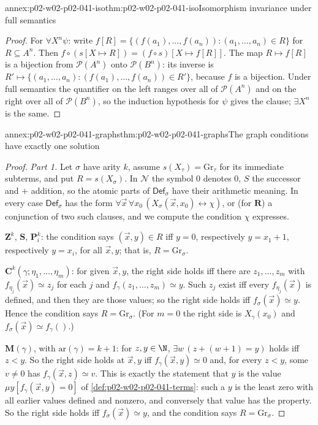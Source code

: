 \begin{annexitem}{annex:p02-w02-p02-041-iso}{thm:p02-w02-p02-041-iso}{Isomorphism invariance under full semantics}
\begin{proof}
For \(\forall X^n\psi\): write \(f[R]=\{(f(a_1),\ldots,f(a_n)):(a_1,\ldots,a_n)\in R\}\)
for \(R\subseteq A^n\).  Then
\(f\circ(s[X\mapsto R])=(f\circ s)[X\mapsto f[R]]\).  The map
\(R\mapsto f[R]\) is a bijection from \(\mathcal P(A^n)\) onto \(\mathcal P(B^n)\): its
inverse is \(R'\mapsto\{(a_1,\ldots,a_n):(f(a_1),\ldots,f(a_n))\in R'\}\),
because \(f\) is a bijection.  Under full semantics the quantifier on the left
ranges over all of \(\mathcal P(A^n)\) and on the right over all of \(\mathcal P(B^n)\),
so the induction hypothesis for \(\psi\) gives the clause; \(\exists X^n\) is
the same.
\end{proof}
\end{annexitem}

\begin{annexitem}{annex:p02-w02-p02-041-graphs}{thm:p02-w02-p02-041-graphs}{The graph conditions have exactly one solution}
\begin{proof}
\emph{Part 1.}  Let \(\sigma\) have arity \(k\), assume
\(s(X_\tau)=\mathrm{Gr}_\tau\) for its immediate subterms, and put
\(R=s(X_\sigma)\).  In \(\mathcal N\) the symbol \(0\) denotes \(0\), \(S\)
the successor and \(+\) addition, so the atomic parts of
\(\mathsf{Def}_\sigma\) have their arithmetic meaning.  In every case
\(\mathsf{Def}_\sigma\) has the form
\(\forall\vec x\,\forall x_0\,(X_\sigma(\vec x,x_0)\leftrightarrow\chi)\), or (for
\(\mathbf R\)) a conjunction of two such clauses, and we compute the condition
\(\chi\) expresses.

\(\mathbf Z^k\), \(\mathbf S\), \(\mathbf P^k_i\): the condition says
\((\vec x,y)\in R\) iff \(y=0\), respectively \(y=x_1+1\), respectively
\(y=x_i\), for all \(\vec x,y\); that is, \(R=\mathrm{Gr}_\sigma\).

\(\mathbf C^k(\gamma;\eta_1,\ldots,\eta_m)\): for given \(\vec x,y\), the right
side holds iff there are \(z_1,\ldots,z_m\) with
\(f_{\eta_j}(\vec x)\simeq z_j\) for each \(j\) and
\(f_\gamma(z_1,\ldots,z_m)\simeq y\).  Such \(z_j\) exist iff every
\(f_{\eta_j}(\vec x)\) is defined, and then they are those values; so the right
side holds iff \(f_\sigma(\vec x)\simeq y\).  Hence the condition says
\(R=\mathrm{Gr}_\sigma\).  (For \(m=0\) the right side is
\(X_\gamma(x_0)\) and \(f_\sigma(\vec x)\simeq f_\gamma()\).)

\(\mathbf M(\gamma)\), with \(\mathrm{ar}(\gamma)=k+1\): for \(z,y\in\N\),
\(\exists w\,(z+(w+1)=y)\) holds iff \(z<y\).  So the right side holds at
\(\vec x,y\) iff \(f_\gamma(\vec x,y)\simeq0\) and, for every \(z<y\), some
\(v\neq0\) has \(f_\gamma(\vec x,z)\simeq v\).  This is exactly the statement
that \(y\) is the value \(\mu y[f_\gamma(\vec x,y)=0]\) of
\cref{def:p02-w02-p02-041-terms}: such a \(y\) is the least zero with all
earlier values defined and nonzero, and conversely that value has the
property.  So the right side holds iff \(f_\sigma(\vec x)\simeq y\), and the
condition says \(R=\mathrm{Gr}_\sigma\).


\end{proof}
\end{annexitem}
